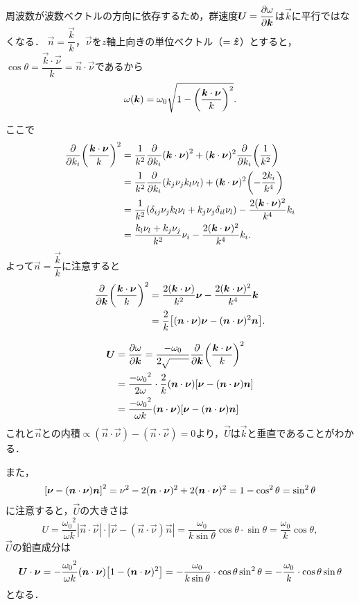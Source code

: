 \spade
周波数が波数ベクトルの方向に依存するため，群速度$\vec{U} = \dpdv{\omega}{\vec{k}}$は$\vec{k}$に平行ではなくなる．
$\vec{n} = \dfrac{\vec{k}}{k}$，$\vec{\nu}$を$z$軸上向きの単位ベクトル（$=\vu*{z}$）とすると，
$\cos\theta=\dfrac{\vec{k}\cdot\vec{\nu}}{k} = \vec{n}\cdot\vec{\nu}$であるから
\[
    \omega(\vec{k}) = \omega_0 \sqrt{ 1- \pqty{\frac{\vec{k}\cdot\vec{\nu}}{k}}^2 } .
\]
\begin{details}
ここで
\begin{align*}
    \pdv{k_i} \pqty{\frac{\vec{k}\cdot\vec{\nu}}{k}}^2 
    &= \frac{1}{k^2} \pdv{k_i} (\vec{k}\cdot\vec{\nu})^2 + (\vec{k}\cdot\vec{\nu})^2 \pdv{k_i} \pqty{\frac{1}{k^2}} \\
    &= \frac{1}{k^2} \pdv{k_i} (k_j\nu_j k_l\nu_l) + (\vec{k}\cdot\vec{\nu})^2 \pqty{ -\frac{2k_i}{k^4} } \\
    &= \frac{1}{k^2} (\delta_{ij}\nu_j k_l\nu_l + k_j\nu_j \delta_{il}\nu_l) - \frac{2(\vec{k}\cdot\vec{\nu})^2}{k^4} k_i  \\
    &= \frac{k_l\nu_l+k_j\nu_j}{k^2} \nu_i - \frac{2(\vec{k}\cdot\vec{\nu})^2}{k^4} k_i .
\end{align*}
よって$\vec{n} = \dfrac{\vec{k}}{k}$に注意すると
\begin{align*}
    \pdv{\vec{k}} \pqty{\frac{\vec{k}\cdot\vec{\nu}}{k}}^2
    &= \frac{2(\vec{k}\cdot\vec{\nu})}{k^2} \vec{\nu} - \frac{2(\vec{k}\cdot\vec{\nu})^2}{k^4} \vec{k} \\
    &= \frac{2}{k} \bqty{ (\vec{n}\cdot\vec{\nu})\vec{\nu} - (\vec{n}\cdot\vec{\nu})^2\vec{n} } .
\end{align*}
\end{details}
%
%
\begin{align}
    \vec{U} &= \pdv{\omega}{\vec{k}} = \frac{-\omega_0}{2\sqrt{\qquad}} \pdv{\vec{k}} \pqty{\frac{\vec{k}\cdot\vec{\nu}}{k}}^2 \notag \\
    &= \frac{-{\omega_0}^2}{2\omega} \cdot \frac{2}{k} (\vec{n}\cdot\vec{\nu}) \bqty{ \vec{\nu} - (\vec{n}\cdot\vec{\nu})\vec{n} } \notag \\
    &= \frac{-{\omega_0}^2}{\omega k} (\vec{n}\cdot\vec{\nu}) \bqty{ \vec{\nu} - (\vec{n}\cdot\vec{\nu})\vec{n} } 
\end{align}
これと$\vec{n}$との内積$\propto (\vec{n}\cdot\vec{\nu}) - (\vec{n}\cdot\vec{\nu}) = 0$より，$\vec{U}$は$\vec{k}$と垂直であることがわかる．

また，
\[
    \bqty{ \vec{\nu} - (\vec{n}\cdot\vec{\nu})\vec{n} }^2 = \nu^2 -2(\vec{n}\cdot\vec{\nu})^2 +2(\vec{n}\cdot\vec{\nu})^2
    = 1-\cos^2\theta = \sin^2\theta
\]
に注意すると，$\vec{U}$の大きさは
\[
    U = \frac{{\omega_0}^2}{\omega k} |\vec{n}\cdot\vec{\nu}| \cdot |\vec{\nu} - (\vec{n}\cdot\vec{\nu})\vec{n}|
    = \frac{\omega_0}{k\sin\theta} \cos\theta \cdot \sin\theta
    = \frac{\omega_0}{k} \cos\theta ,
\]
$\vec{U}$の鉛直成分は
\[
    \vec{U}\cdot\vec{\nu} = -\frac{{\omega_0}^2}{\omega k} (\vec{n}\cdot\vec{\nu}) \bqty{ 1-(\vec{n}\cdot\vec{\nu})^2 }
    = -\frac{\omega_0}{k\sin\theta} \cdot \cos\theta \sin^2\theta
    = -\frac{\omega_0}{k} \cdot \cos\theta \sin\theta
\]
となる．



\BackToTheToc